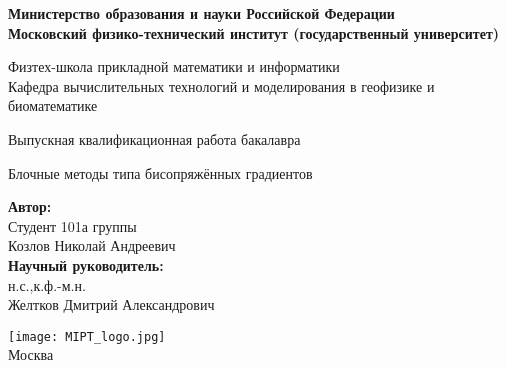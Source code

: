 \begin{center}
    \large\textbf{Министерство образования и науки Российской Федерации \\
    Московский физико-технический институт (государственный
    университет)} \\
    \vspace{1cm}

    Физтех-школа прикладной математики и информатики \\

    Кафедра вычислительных технологий и моделирования в геофизике и биоматематике\\

    \vspace{3em}

    Выпускная квалификационная работа бакалавра
\end{center}

\begin{center}
    \vspace{\fill}
    \LARGE{Блочные методы типа бисопряжённых градиентов}

    \vspace{\fill}
\end{center}


\begin{flushright}
    \textbf{Автор:} \\
    Студент 101а группы \\
    Козлов Николай Андреевич \\
    \vspace{2em}
    \textbf{Научный руководитель:} \\
    н.с.,к.ф.-м.н. \\
    Желтков Дмитрий Александрович \\
\end{flushright}

\vspace{7em}

\begin{center}
    \texttt{[image: MIPT\_logo.jpg]}\\
    Москва \the\year{}
\end{center}

\thispagestyle{empty}

\newpage
\setcounter{page}{2}
\fancyfoot[c]{\thepage}
\fancyhead[R]{}